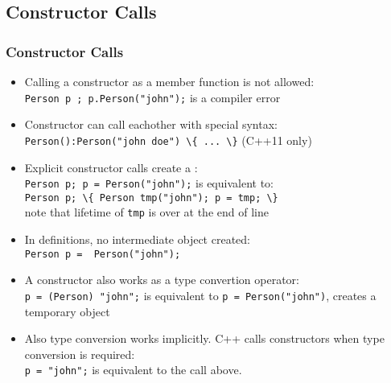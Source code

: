 \subsection{Constructor Calls}
\begin{frame}
\frametitle{Constructor Calls}
\begin{itemize}
\item Calling a constructor as a member function is not allowed:\\
\lstinline!Person p ; p.Person("john");! is a compiler error
\item Constructor  can call eachother with special syntax:\\
\lstinline!Person():Person("john doe") \{ ... \}! (C++11 only)
\item Explicit constructor calls create a :\\
\lstinline!Person p; p = Person("john");! is equivalent to:\\
\lstinline!Person p; \{ Person tmp("john"); p = tmp; \} !\\
note that lifetime of \lstinline!tmp! is over at the end of line
\item In definitions, no intermediate object created:\\
\lstinline!Person p =  Person("john");! 
\item A constructor also works as a type convertion operator:\\
\lstinline!p = (Person) "john";! is equivalent to \lstinline!p = Person("john")!, creates a
temporary object
\item Also type conversion works implicitly. C++ calls constructors when type conversion is required:\\
\lstinline!p = "john";! is equivalent to the call above.
\end{itemize}
\end{frame}

